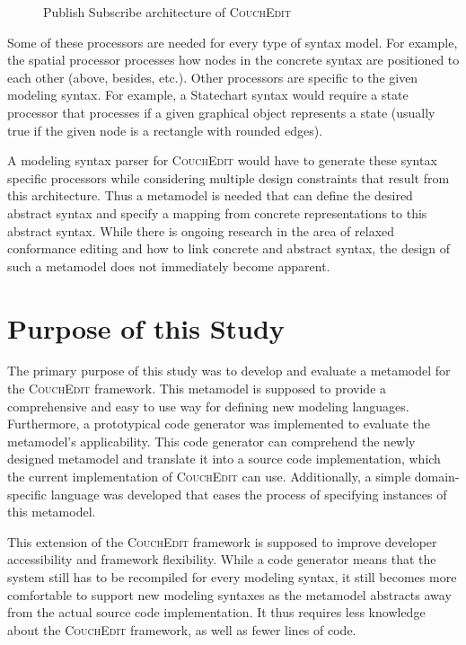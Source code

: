 \begin{figure}
  \centering
  
  \caption{Publish Subscribe architecture of \textsc{CouchEdit}}
  \label{fig:processors}
\end{figure}

Some of these processors are needed for every type of syntax model. For example, the spatial processor processes how nodes in the concrete syntax are positioned to each other (above, besides, etc.). Other processors are specific to the given modeling syntax. For example, a Statechart syntax would require a state processor that processes if a given graphical object represents a state (usually true if the given node is a rectangle with rounded edges).

A modeling syntax parser for \textsc{CouchEdit} would have to generate these syntax specific processors while considering multiple design constraints that result from this architecture. Thus a metamodel is needed that can define the desired abstract syntax and specify a mapping from concrete representations to this abstract syntax. While there is ongoing research in the area of relaxed conformance editing and how to link concrete and abstract syntax, the design of such a metamodel does not immediately become apparent.

\section{Purpose of this Study}
The primary purpose of this study was to develop and evaluate a metamodel for the \textsc{CouchEdit} framework. This metamodel is supposed to provide a comprehensive and easy to use way for defining new modeling languages. Furthermore, a prototypical code generator was implemented to evaluate the metamodel's applicability. This code generator can comprehend the newly designed metamodel and translate it into a source code implementation, which the current implementation of \textsc{CouchEdit} can use. Additionally, a simple domain-specific language was developed that eases the process of specifying instances of this metamodel.

This extension of the \textsc{CouchEdit} framework is supposed to improve developer accessibility and framework flexibility. While a code generator means that the system still has to be recompiled for every modeling syntax, it still becomes more comfortable to support new modeling syntaxes as the metamodel abstracts away from the actual source code implementation. It thus requires less knowledge about the \textsc{CouchEdit} framework, as well as fewer lines of code.


